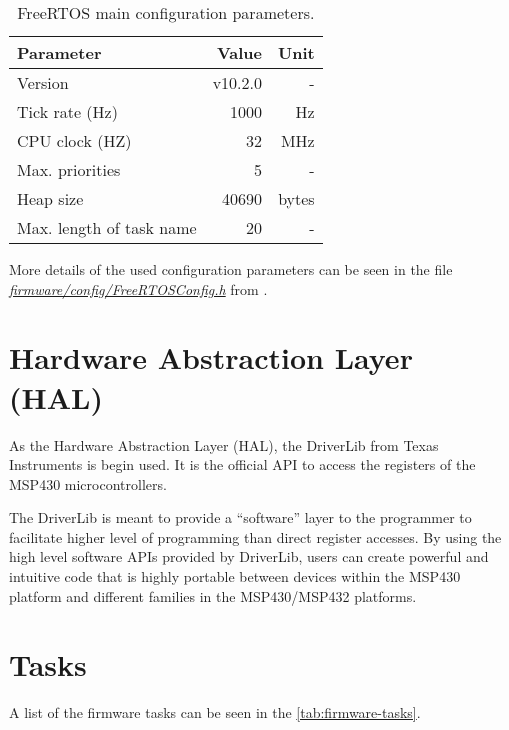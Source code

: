 \begin{table}[!h]
    \centering
    \begin{tabular}{lrr}
        \toprule[1.5pt]
        \textbf{Parameter}       & \textbf{Value} & \textbf{Unit} \\
        \midrule
        Version                  & v10.2.0        & - \\
        Tick rate (Hz)           & 1000           & Hz \\
        CPU clock (HZ)           & 32             & MHz \\
        Max. priorities          & 5              & - \\
        Heap size                & 40690          & bytes \\
        Max. length of task name & 20             & - \\
        \bottomrule[1.5pt]
    \end{tabular}
    \caption{FreeRTOS main configuration parameters.}
    \label{tab:freertos-config}
\end{table}

More details of the used configuration parameters can be seen in the file \textit{\href{https://github.com/spacelab-ufsc/eps2/blob/master/firmware/config/FreeRTOSConfig.h}{firmware/config/FreeRTOSConfig.h}} from \cite{eps2}.

\section{Hardware Abstraction Layer (HAL)}

As the Hardware Abstraction Layer (HAL), the DriverLib \cite{driverlib} from Texas Instruments is begin used. It is the official API to access the registers of the MSP430 microcontrollers.

The DriverLib is meant to provide a ``software'' layer to the programmer to facilitate higher level of programming than direct register accesses. By using the high level software APIs provided by DriverLib, users can create powerful and intuitive code that is highly portable between devices within the MSP430 platform and different families in the MSP430/MSP432 platforms.

\section{Tasks}

A list of the firmware tasks can be seen in the \autoref{tab:firmware-tasks}.

